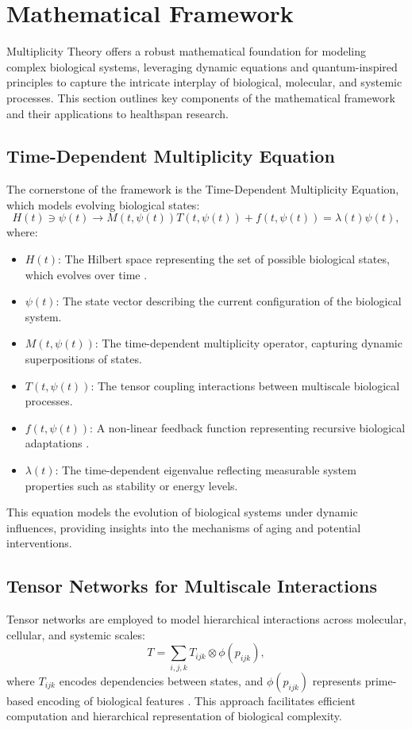 \documentclass{article}
\theoremstyle{plain}
\begin{document}
\section{Mathematical Framework}
\label{sec:math_framework}

Multiplicity Theory offers a robust mathematical foundation for modeling complex biological systems, leveraging dynamic equations and quantum-inspired principles to capture the intricate interplay of biological, molecular, and systemic processes. This section outlines key components of the mathematical framework and their applications to healthspan research.

\subsection{Time-Dependent Multiplicity Equation}
The cornerstone of the framework is the Time-Dependent Multiplicity Equation, which models evolving biological states:
\begin{equation}
H(t) \ni \psi(t) \rightarrow M(t, \psi(t)) T(t, \psi(t)) + f(t, \psi(t)) = \lambda(t) \psi(t),
\end{equation}
where:
\begin{itemize}
    \item $H(t)$: The Hilbert space representing the set of possible biological states, which evolves over time \cite{mathBiology2023}.
    \item $\psi(t)$: The state vector describing the current configuration of the biological system.
    \item $M(t, \psi(t))$: The time-dependent multiplicity operator, capturing dynamic superpositions of states.
    \item $T(t, \psi(t))$: The tensor coupling interactions between multiscale biological processes.
    \item $f(t, \psi(t))$: A non-linear feedback function representing recursive biological adaptations \cite{feedbackMechanisms2023}.
    \item $\lambda(t)$: The time-dependent eigenvalue reflecting measurable system properties such as stability or energy levels.
\end{itemize}
This equation models the evolution of biological systems under dynamic influences, providing insights into the mechanisms of aging and potential interventions.

\subsection{Tensor Networks for Multiscale Interactions}
Tensor networks are employed to model hierarchical interactions across molecular, cellular, and systemic scales:
\begin{equation}
T = \sum_{i,j,k} T_{ijk} \otimes \phi(p_{ijk}),
\end{equation}
where $T_{ijk}$ encodes dependencies between states, and $\phi(p_{ijk})$ represents prime-based encoding of biological features \cite{tensorNetworks2022}. This approach facilitates efficient computation and hierarchical representation of biological complexity.
\end{document}
